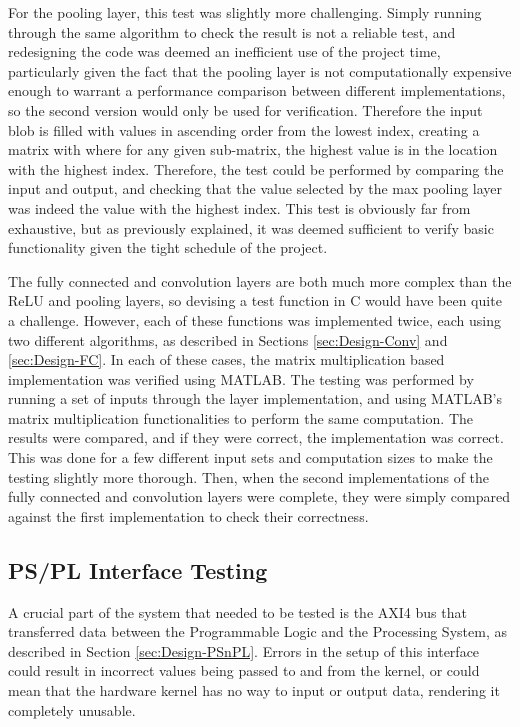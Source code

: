 \documentclass[12pt]{article}
\begin{document}
For the pooling layer, this test was slightly more challenging. Simply running through the same algorithm to check the result is not a reliable test, and redesigning the code was deemed an inefficient use of the project time, particularly given the fact that the pooling layer is not computationally expensive enough to warrant a performance comparison between different implementations, so the second version would only be used for verification. Therefore the input blob is filled with values in ascending order from the lowest index, creating a matrix with where for any given sub-matrix, the highest value is in the location with the highest index. Therefore, the test could be performed by comparing the input and output, and checking that the value selected by the max pooling layer was indeed the value with the highest index. This test is obviously far from exhaustive, but as previously explained, it was deemed sufficient to verify basic functionality given the tight schedule of the project.

The fully connected and convolution layers are both much more complex than the ReLU and pooling layers, so devising a test function in C would have been quite a challenge. However, each of these functions was implemented twice, each using two different algorithms, as described in Sections \ref{sec:Design-Conv} and \ref{sec:Design-FC}. In each of these cases, the matrix multiplication based implementation was verified using MATLAB. The testing was performed by running a set of inputs through the layer implementation, and using MATLAB's matrix multiplication functionalities to perform the same computation. The results were compared, and if they were correct, the implementation was correct. This was done for a few different input sets and computation sizes to make the testing slightly more thorough. Then, when the second implementations of the fully connected and convolution layers were complete, they were simply compared against the first implementation to check their correctness.

\subsection{PS/PL Interface Testing}
\label{sec:Test-AXI}

A crucial part of the system that needed to be tested is the AXI4 bus that transferred data between the Programmable Logic and the Processing System, as described in Section \ref{sec:Design-PSnPL}. Errors in the setup of this interface could result in incorrect values being passed to and from the kernel, or could mean that the hardware kernel has no way to input or output data, rendering it completely unusable.
\end{document}
